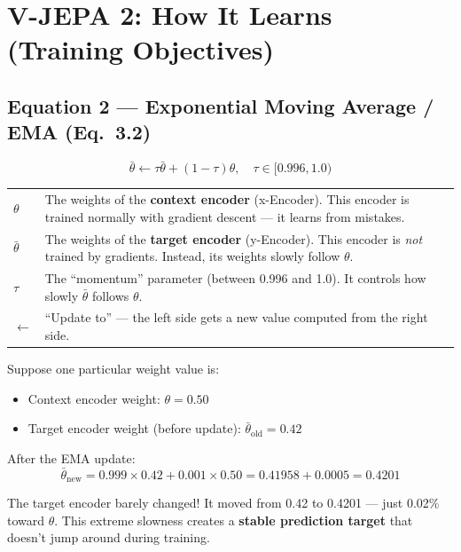 \documentclass[12pt, a4paper]{article}
\begin{document}
\newpage
\section{V-JEPA 2: How It Learns (Training Objectives)}

\subsection{Equation 2 --- Exponential Moving Average / EMA (Eq.~3.2)}

\begin{eqbox}
\[
\bar{\theta} \leftarrow \tau \bar{\theta} + (1 - \tau) \theta, \quad \tau \in [0.996, 1.0)
\]
\end{eqbox}

\begin{explainbox}
\begin{tabular}{lp{11cm}}
$\theta$ & The weights of the \textbf{context encoder} (x-Encoder). This encoder is trained normally with gradient descent --- it learns from mistakes.\\[0.3cm]
$\bar{\theta}$ & The weights of the \textbf{target encoder} (y-Encoder). This encoder is \textit{not} trained by gradients. Instead, its weights slowly follow $\theta$.\\[0.3cm]
$\tau$ & The ``momentum'' parameter (between 0.996 and 1.0). It controls how slowly $\bar{\theta}$ follows $\theta$.\\[0.3cm]
$\leftarrow$ & ``Update to'' --- the left side gets a new value computed from the right side.
\end{tabular}
\end{explainbox}

\begin{examplebox}[Numerical Example with $\tau = 0.999$]
Suppose one particular weight value is:
\begin{itemize}
    \item Context encoder weight: $\theta = 0.50$
    \item Target encoder weight (before update): $\bar{\theta}_{\text{old}} = 0.42$
\end{itemize}

After the EMA update:
\[
\bar{\theta}_{\text{new}} = 0.999 \times 0.42 + 0.001 \times 0.50 = 0.41958 + 0.0005 = 0.4201
\]

The target encoder barely changed! It moved from 0.42 to 0.4201 --- just 0.02\% toward $\theta$. This extreme slowness creates a \textbf{stable prediction target} that doesn't jump around during training.
\end{examplebox}
\end{document}
